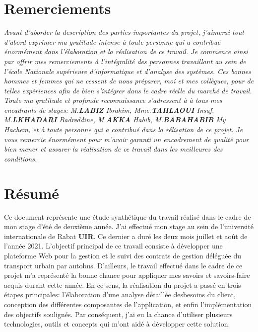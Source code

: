 \documentclass[a4paper]{report}
\begin{document}
 \setcounter{page}{1}
\begin{doublespace}
	\chapter*{\centering Remerciements}
	\textit{
		Avant d'aborder la description des parties importantes du projet,
		j'aimerai tout d’abord exprimer ma gratitude
		intense à toute personne qui a contribué énormément dans l'élaboration
		et la réalisation de ce travail. Je commence
		ainsi par offrir mes remerciements à l'intégralité des personnes
		travaillant au sein de l’école Nationale supérieure d’informatique et d’analyse
		des systèmes. Ces bonnes hommes et femmes qui ne cessent de nous préparer, moi
		et
		mes collègues, pour de telles expériences afin de bien s’intégrer dans
		le cadre réelle du marché de travail.
		Toute ma gratitude et profonde reconnaissance s’adressent à à tous mes
		encadrants de stages: M.\textbf{LABIZ} Ibrahim,  Mme.\textbf{TAHLAOUI} Insaf, M.\textbf{LKHADARI} Badreddine,
		M.\textbf{AKKA} Habib, M.\textbf{BABAHABIB} My Hachem, et à toute personne qui a contribué dans la rélisation de ce projet. Je vous remercie énormément pour m'avoir
		garanti un encadrement de qualité pour bien mener
		et assurer la réalisation de ce travail dans les meilleures des
		conditions.
	}

	\newpage

	\chapter*{\centering Résumé}

	Ce document représente une étude synthétique du travail réalisé dans le
	cadre de mon stage d'été de deuxième année. J'ai effectué mon stage au sein de
	l'université internationale de Rabat \textbf{UIR}. Ce dernier a duré les deux
	mois juillet et août de l'année 2021. L’objectif principal de ce travail
	consiste à développer une plateforme Web pour la gestion et le suivi des
	contrats de gestion déléguée du transport urbain par autobus. D'ailleurs,
	le travail effectué dans le cadre de ce projet m'a représenté
	la bonne chance pour appliquer mes savoirs et savoirs-faire acquis durant
	cette année. En ce sens, la réalisation du projet a passé en trois étapes principales:
	l'élaboration d'une analyse détaillée desbesoins du client,
	conception des différentes composantes de l'application, et
	enfin l'implémentation des objectifs soulignés. Par conséquent, j'ai eu la
	chance d'utiliser plusieurs technologies, outils et concepts qui m'ont aidé à
	développer cette solution.


\end{doublespace}
\end{document}
